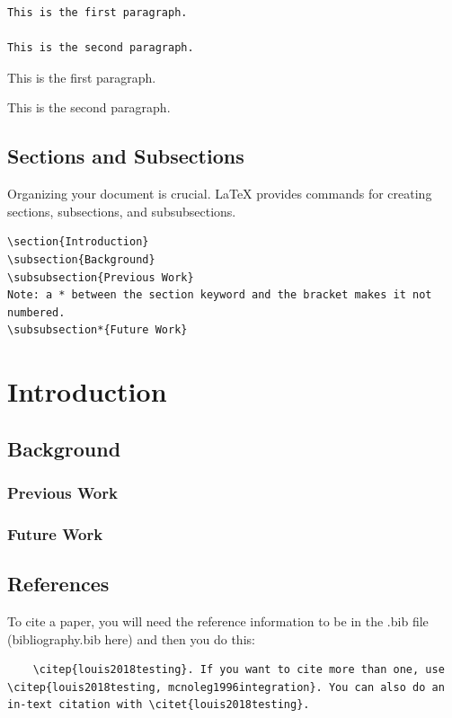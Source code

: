 \begin{verbatim}
This is the first paragraph.

This is the second paragraph.
\end{verbatim}

This is the first paragraph.

This is the second paragraph.


\subsection{Sections and Subsections}

Organizing your document is crucial. LaTeX provides commands for creating sections, subsections, and subsubsections.

\begin{verbatim}
\section{Introduction}
\subsection{Background}
\subsubsection{Previous Work}
Note: a * between the section keyword and the bracket makes it not numbered. 
\subsubsection*{Future Work}
\end{verbatim}

\section{Introduction}
\subsection{Background}
\subsubsection{Previous Work}
\subsubsection*{Future Work}


\subsection{References}
To cite a paper, you will need the reference information to be in the .bib file (bibliography.bib here) and then you do this: 
\begin{verbatim}
    \citep{louis2018testing}. If you want to cite more than one, use \citep{louis2018testing, mcnoleg1996integration}. You can also do an in-text citation with \citet{louis2018testing}. 
\end{verbatim}

